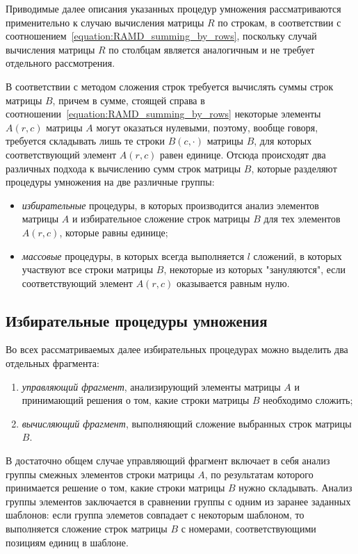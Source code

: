 \documentclass[a4paper,12pt]{report}
\begin{document}
Приводимые далее описания указанных процедур умножения рассматриваются применительно к случаю вычисления матрицы $R$
по строкам, в соответствии с соотношением~\ref{equation:RAMD_summing_by_rows}, поскольку случай вычисления матрицы $R$ по
столбцам является аналогичным и не требует отдельного рассмотрения.

В соответствии с методом сложения строк требуется вычислять суммы строк матрицы $B$, причем в сумме, стоящей
справа в соотношении~\ref{equation:RAMD_summing_by_rows} некоторые элементы $A(r,c)$ матрицы $A$ могут оказаться
нулевыми, поэтому, вообще говоря, требуется складывать лишь те строки $B(c,\cdot)$ матрицы $B$, для которых
соответствующий элемент $A(r,c)$ равен единице. Отсюда происходят два различных подхода к вычислению сумм
строк матрицы $B$, которые разделяют процедуры умножения на две различные группы:
\begin{itemize}
	\item \emph{избирательные} процедуры, в которых производится анализ элементов матрицы $A$ и избирательное
			сложение строк матрицы $B$ для тех элементов $A(r,c)$, которые равны единице;
	\item \emph{массовые} процедуры, в которых всегда выполняется $l$ сложений, в которых участвуют все строки
			матрицы $B$, некоторые из которых "зануляются"{}, если соответствующий элемент $A(r,c)$ оказывается равным нулю.
\end{itemize}

\subsection { Избирательные процедуры умножения } \label{subsection:RAM_deliberate_routines}

Во всех рассматриваемых далее избирательных процедурах можно выделить два отдельных фрагмента:

\begin {enumerate}
	\item \emph{управляющий фрагмент}, анализирующий элементы матрицы $A$ и принимающий решения о том,
			какие строки матрицы $B$ необходимо сложить;
	\item \emph{вычисляющий фрагмент}, выполняющий сложение выбранных строк матрицы $B$.
\end{enumerate}

В достаточно общем случае управляющий фрагмент включает в себя анализ группы смежных элементов строки матрицы $A$,
по результатам которого принимается решение о том, какие строки матрицы $B$ нужно складывать. Анализ группы
элементов заключается в сравнении группы с одним из заранее заданных шаблонов: если группа элеметов совпадает с
некоторым шаблоном, то выполняется сложение строк матрицы $B$ с номерами, соответствующими позициям единиц в шаблоне.
\end{document}
